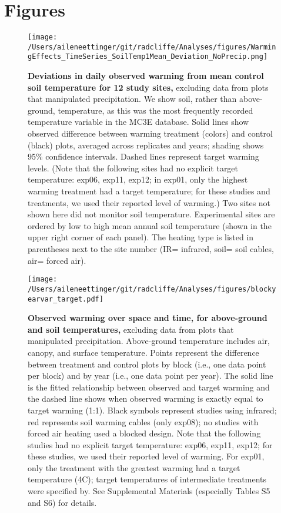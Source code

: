 \documentclass{article}
\begin{document}
\section* {Figures}
\clearpage
 \begin{figure}[h]
\centering
 \texttt{[image: /Users/aileneettinger/git/radcliffe/Analyses/figures/WarmingEffects\_TimeSeries\_SoilTemp1Mean\_Deviation\_NoPrecip.png]}
 \caption{\textbf{Deviations in daily observed warming from mean control soil temperature for 12 study sites,} excluding data from plots that manipulated precipitation. We show soil, rather than above-ground, temperature, as this was the most frequently recorded temperature variable in the MC3E database. Solid lines show observed difference between warming treatment (colors) and control (black) plots, averaged across replicates and years; shading shows 95\% confidence intervals. Dashed lines represent target warming levels. (Note that the following sites had no explicit target temperature: exp06, exp11, exp12; in exp01, only the highest warming treatment had a target temperature; for these studies and treatments, we used their reported level of warming.) Two sites not shown here did not monitor soil temperature. Experimental sites are ordered by low to high mean annual soil temperature (shown in the upper right corner of each panel). The heating type is listed in parentheses next to the site number (IR= infrared, soil= soil cables, air= forced air).} %
 \label{fig:effwarm}
 \end{figure}
 \begin{figure}[p]
 \centering
 \texttt{[image: /Users/aileneettinger/git/radcliffe/Analyses/figures/blockyearvar\_target.pdf]} 
 \caption{\textbf{Observed warming over space and time, for above-ground and soil temperatures,} excluding data from plots that manipulated precipitation. Above-ground temperature includes air, canopy, and surface temperature. Points represent the difference between treatment and control plots by block (i.e., one data point per block) and by year (i.e., one data point per year). The solid line is the fitted relationship between observed and target warming and the dashed line shows when observed warming is exactly equal to target warming (1:1). Black symbols represent studies using infrared; red represents soil warming cables (only exp08); no studies with forced air heating used a blocked design. Note that the following studies had no explicit target temperature: exp06, exp11, exp12; for these studies, we used their reported level of warming. For exp01, only the treatment with the greatest warming had a target temperature (4\degree C); target temperatures of intermediate treatments were specified by. See Supplemental Materials (especially Tables S5 and S6) for details.}
 \label{fig:blockyear}
 \end{figure}
\end{document}

